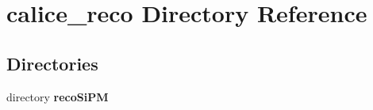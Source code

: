\section{calice\-\_\-reco Directory Reference}
\label{dir_aa5152576b83acadfecf1e9f3e210c0e}
\subsection*{Directories}
\begin{DoxyCompactItemize}
\item 
directory {\bf reco\-Si\-P\-M}
\end{DoxyCompactItemize}
